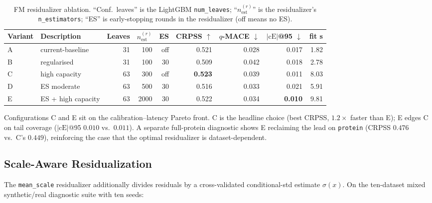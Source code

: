 \documentclass{tpm2026}
\begin{document}
\begin{table}[!h]
  \centering
  \caption{FM residualizer ablation. ``Conf.\ leaves'' is the LightGBM \texttt{num\_leaves}; ``$n_{\text{est}}^{(r)}$'' is the residualizer's \texttt{n\_estimators}; ``ES'' is early-stopping rounds in the residualizer (off means no ES).}\label{tab:resid-AE}
  \footnotesize
  \begin{tabular}{llrrrrrrr}
    \toprule
    Variant & Description & Leaves & $n_{\text{est}}^{(r)}$ & ES & CRPSS $\uparrow$ & $q$-MACE $\downarrow$ & $|\text{cE}|$@95 $\downarrow$ & fit s \\
    \midrule
    A & current-baseline   & 31 & 100 & off & 0.521 & 0.028 & 0.017 & 1.82 \\
    B & regularised        & 31 & 100 & 30  & 0.509 & 0.042 & 0.018 & 2.78 \\
    C & high capacity      & 63 & 300 & off & \textbf{0.523} & 0.039 & 0.011 & 8.03 \\
    D & ES moderate        & 63 & 500 & 30  & 0.516 & 0.033 & 0.021 & 5.91 \\
    E & ES + high capacity & 63 & 2000& 30  & 0.522 & 0.034 & \textbf{0.010} & 9.81 \\
    \bottomrule
  \end{tabular}
\end{table}

Configurations C and E sit on the calibration--latency Pareto front. C is the headline choice (best CRPSS, $1.2\times$ faster than E); E edges C on tail coverage ($|\text{cE}|$@95 $0.010$ vs.\ $0.011$). A separate full-protein diagnostic shows E reclaiming the lead on \texttt{protein} (CRPSS $0.476$ vs.\ C's $0.449$), reinforcing the case that the optimal residualizer is dataset-dependent.

\subsection{Scale-Aware Residualization}\label{app:mean-scale}

The \texttt{mean\_scale} residualizer additionally divides residuals by a cross-validated conditional-std estimate $\hat\sigma(x)$. On the ten-dataset mixed synthetic/real diagnostic suite with ten seeds:
\end{document}
